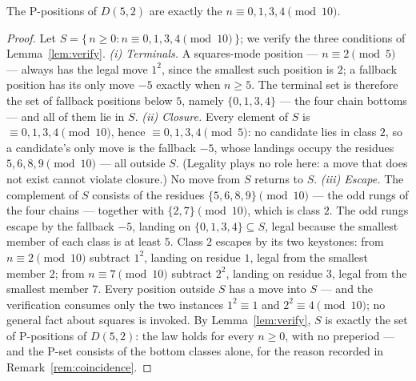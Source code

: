 \begin{example}[$D(5,2)$ solved]\label{ex:d52}
The P-positions of $D(5,2)$ are exactly the $n \equiv 0, 1, 3, 4
\pmod{10}$.
\end{example}
\begin{proof}
Let $S = \{\, n \ge 0 : n \equiv 0, 1, 3, 4 \pmod{10} \,\}$; we verify
the three conditions of Lemma~\ref{lem:verify}.
\emph{(i) Terminals.} A squares-mode position --- $n \equiv 2 \pmod 5$ ---
always has the legal move $1^2$, since the smallest such position is $2$;
a fallback position has its only move $-5$ exactly when $n \ge 5$. The
terminal set is therefore the set of fallback positions below $5$, namely
$\{0, 1, 3, 4\}$ --- the four chain bottoms --- and all of them lie in
$S$.
\emph{(ii) Closure.} Every element of $S$ is $\equiv 0, 1, 3, 4
\pmod{10}$, hence $\equiv 0, 1, 3, 4 \pmod 5$: no candidate lies in class
$2$, so a candidate's only move is the fallback $-5$, whose landings
occupy the residues $5, 6, 8, 9 \pmod{10}$ --- all outside $S$. (Legality
plays no role here: a move that does not exist cannot violate closure.)
No move from $S$ returns to $S$.
\emph{(iii) Escape.} The complement of $S$ consists of the residues
$\{5, 6, 8, 9\} \pmod{10}$ --- the odd rungs of the four chains ---
together with $\{2, 7\} \pmod{10}$, which is class $2$. The odd rungs
escape by the fallback $-5$, landing on $\{0, 1, 3, 4\} \subseteq S$,
legal because the smallest member of each class is at least $5$. Class
$2$ escapes by its two keystones: from $n \equiv 2 \pmod{10}$ subtract
$1^2$, landing on residue $1$, legal from the smallest member $2$; from
$n \equiv 7 \pmod{10}$ subtract $2^2$, landing on residue $3$, legal from
the smallest member $7$. Every position outside $S$ has a move into $S$
--- and the verification consumes only the two instances $1^2 \equiv 1$
and $2^2 \equiv 4 \pmod{10}$; no general fact about squares is invoked.
By Lemma~\ref{lem:verify}, $S$ is exactly the set of P-positions of
$D(5,2)$: the law holds for every $n \ge 0$, with no preperiod ---
and the P-set consists of the bottom classes alone, for the reason
recorded in Remark~\ref{rem:coincidence}.
\end{proof}

